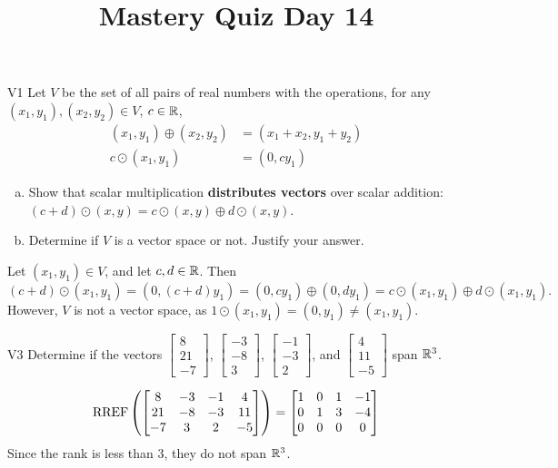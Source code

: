 \documentclass{sbgLAquiz}
\title{Mastery Quiz Day 14 }
\begin{document}
\begin{problem}{V1}
Let $V$ be the set of all pairs of real numbers with the operations, for any $(x_1,y_1), (x_2,y_2) \in V$, $c \in \mathbb{R}$,
\begin{align*}
(x_1,y_1) \oplus (x_2,y_2) &= (x_1+x_2,y_1+y_2) \\
c \odot (x_1,y_1) &= (0, cy_1)
\end{align*}
\begin{enumerate}[(a)]
\item Show that scalar multiplication
      \textbf{distributes vectors} over scalar addition:
      \((c+d)\odot(x,y)=
      c\odot(x,y) \oplus d\odot(x,y)\).
\item Determine if $V$ is a vector space or not.  Justify your answer.
\end{enumerate}
\end{problem}
\begin{solution}
Let $(x_1,y_1) \in V$, and let $c,d \in \mathbb{R}$.  Then
$$(c+d)\odot (x_1,y_1)=(0, (c+d)y_1) = (0,cy_1) \oplus (0,dy_1) = c \odot (x_1,y_1) \oplus d \odot (x_1,y_1).$$
However, $V$ is not a vector space, as $1 \odot (x_1,y_1) = (0,y_1) \neq (x_1,y_1)$.
\end{solution}


\begin{problem}{V3}
Determine if the vectors  $\begin{bmatrix} 8 \\ 21 \\ -7 \end{bmatrix}$, $\begin{bmatrix} -3 \\ -8 \\ 3 \end{bmatrix}$, $\begin{bmatrix} -1 \\ -3 \\ 2 \end{bmatrix}$, and $\begin{bmatrix} 4 \\ 11 \\ -5 \end{bmatrix}$ span $\mathbb{R}^3$.
\end{problem}
\begin{solution}
$$\operatorname{RREF}\left(\begin{bmatrix} 8 & -3 & -1 & 4 \\ 21 & -8 & -3 & 11 \\ -7 & 3 & 2 & -5  \end{bmatrix} \right) = \begin{bmatrix} 1 & 0 & 1 & -1 \\ 0 & 1 & 3 & -4 \\ 0 & 0 & 0 & 0\end{bmatrix} $$
Since the rank is less than 3, they do not span $\mathbb{R}^3$.
\end{solution}
\end{document}
